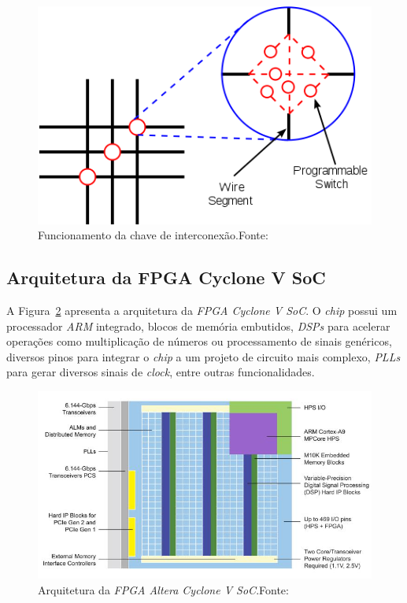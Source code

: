     \begin{figure}[H]
    \centering
    \includegraphics[width=.5\linewidth]
        {../images/switch_box_wikimedia.png}
        \caption[Funcionamento da chave de interconexão]
            {Funcionamento da chave de interconexão.\quad Fonte:~\cite{fpga_switch_box}}
        \label{fig:fpga_switch_box}
    \end{figure}


    \subsection{Arquitetura da FPGA Cyclone V SoC}
    { A Figura~\ref{fig:cyclone_v_arch} apresenta a arquitetura da
        \textit{FPGA Cyclone V SoC}. O \textit{chip} possui um processador
        \textit{ARM} integrado, blocos de memória embutidos, \textit{DSPs} para
        acelerar operações como multiplicação de números ou processamento de
        sinais genéricos, diversos pinos para integrar o \textit{chip} a
        um projeto de circuito mais complexo, \textit{PLLs} para gerar diversos
        sinais de \textit{clock}, entre outras funcionalidades.
    }

    \begin{figure}[H]
    \centering
    \includegraphics[width=1\linewidth]
        {../images/altera_cyclone_v_soc_architectural_downscale.jpg}
        \caption[Arquitetura da FPGA Intel Cyclone V SoC]
            {Arquitetura da \textit{FPGA Altera Cyclone V SoC}.\quad Fonte:~\cite{cyclone_v_soc}}
        \label{fig:cyclone_v_arch}
    \end{figure}


